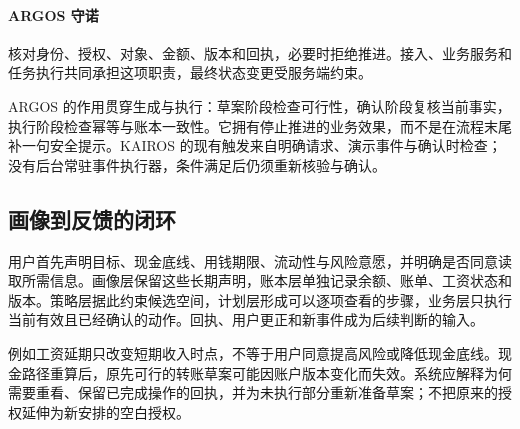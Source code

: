 \paragraph{ARGOS 守诺}
核对身份、授权、对象、金额、版本和回执，必要时拒绝推进。接入、业务服务和任务执行共同承担这项职责，最终状态变更受服务端约束。


ARGOS 的作用贯穿生成与执行：草案阶段检查可行性，确认阶段复核当前事实，执行阶段检查幂等与账本一致性。它拥有停止推进的业务效果，而不是在流程末尾补一句安全提示。KAIROS 的现有触发来自明确请求、演示事件与确认时检查；没有后台常驻事件执行器，条件满足后仍须重新核验与确认。

\subsection{画像到反馈的闭环}
用户首先声明目标、现金底线、用钱期限、流动性与风险意愿，并明确是否同意读取所需信息。画像层保留这些长期声明，账本层单独记录余额、账单、工资状态和版本。策略层据此约束候选空间，计划层形成可以逐项查看的步骤，业务层只执行当前有效且已经确认的动作。回执、用户更正和新事件成为后续判断的输入。

例如工资延期只改变短期收入时点，不等于用户同意提高风险或降低现金底线。现金路径重算后，原先可行的转账草案可能因账户版本变化而失效。系统应解释为何需要重看、保留已完成操作的回执，并为未执行部分重新准备草案；不把原来的授权延伸为新安排的空白授权。
